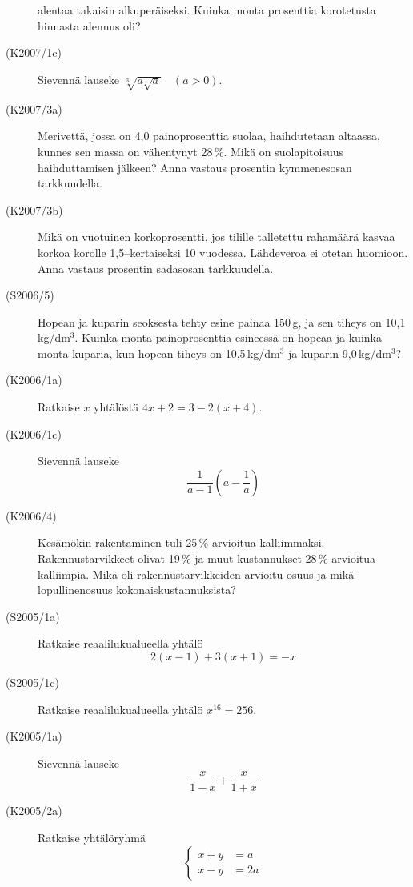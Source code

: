 \begin{description}
                       alentaa takaisin alkuperäiseksi. Kuinka monta prosenttia korotetusta hinnasta alennus oli?
    \item[(K2007/1c)]  Sievennä lauseke $ \sqrt[3]{a \sqrt{a}} \quad (a > 0) $.
    \item[(K2007/3a)]  Merivettä, jossa on 4,0 painoprosenttia suolaa, haihdutetaan altaassa, kunnes sen massa on
                       vähentynyt 28\,\%. Mikä on suolapitoisuus haihduttamisen jälkeen? Anna vastaus prosentin
                       kymmenesosan tarkkuudella. 
    \item[(K2007/3b)]  Mikä on vuotuinen korkoprosentti, jos tilille talletettu rahamäärä kasvaa korkoa korolle 1,5--kertaiseksi
                       10 vuodessa. Lähdeveroa ei otetan huomioon. Anna vastaus prosentin sadasosan tarkkuudella.
    \item[(S2006/5)]   Hopean ja kuparin seoksesta tehty esine painaa 150\,g, ja sen tiheys on 10,1\,kg/dm\(^3\). Kuinka monta
                       painoprosenttia esineessä on hopeaa ja kuinka monta kuparia, kun hopean tiheys on 10,5\,kg/dm\(^3\) ja kuparin
                       9,0\,kg/dm\(^3\)?
    \item[(K2006/1a)]  Ratkaise $x$ yhtälöstä $4x + 2 =  3 - 2(x + 4)$.
    \item[(K2006/1c)]  Sievennä lauseke 
                       \[ \frac{1}{a - 1} \left( a - \frac{1}{a} \right) \]
    \item[(K2006/4)]   Kesämökin rakentaminen tuli 25\,\% arvioitua kalliimmaksi. Rakennustarvikkeet olivat 19\,\% ja muut
                       kustannukset 28\,\% arvioitua kalliimpia. Mikä oli rakennustarvikkeiden arvioitu osuus ja mikä
                       lopullinenosuus kokonaiskustannuksista?
    \item[(S2005/1a)]  Ratkaise reaalilukualueella yhtälö 
                        \[ 2(x - 1) + 3(x + 1 ) = -x \]
    \item[(S2005/1c)]  Ratkaise reaalilukualueella yhtälö $ x^{16} = 256 $.
    \item[(K2005/1a)]  Sievennä lauseke
                        \[ \frac{x}{1 - x} + \frac{x}{1 + x} \]
    \item[(K2005/2a)]  Ratkaise yhtälöryhmä
                       \[
                         \left\{
                         \begin{matrix}
                              x + y &= a \\
                              x - y &= 2a
                         \end{matrix}
\]
\end{description}
